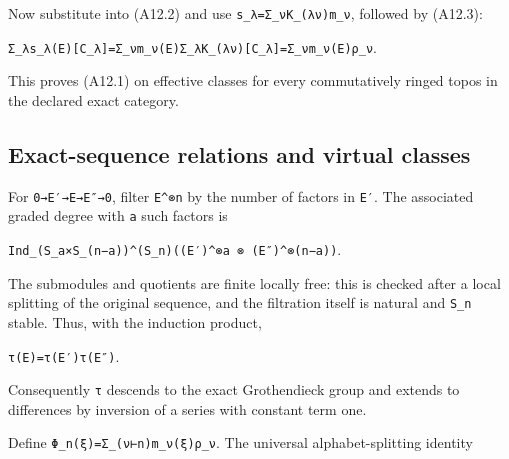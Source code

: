 \documentclass[
  10pt,
]{article}
\begin{document}
Now substitute into (A12.2) and use
\texttt{\small s\_\allowbreak{}λ=\allowbreak{}Σ\_\allowbreak{}νK\_\allowbreak{}(\allowbreak{}λν)\allowbreak{}m\_\allowbreak{}ν},
followed by (A12.3):

\texttt{\small Σ\_\allowbreak{}λs\_\allowbreak{}λ(\allowbreak{}E)\allowbreak{}[\allowbreak{}C\_\allowbreak{}λ]\allowbreak{}=\allowbreak{}Σ\_\allowbreak{}νm\_\allowbreak{}ν(\allowbreak{}E)\allowbreak{}Σ\_\allowbreak{}λK\_\allowbreak{}(\allowbreak{}λν)\allowbreak{}[\allowbreak{}C\_\allowbreak{}λ]\allowbreak{}=\allowbreak{}Σ\_\allowbreak{}νm\_\allowbreak{}ν(\allowbreak{}E)\allowbreak{}ρ\_\allowbreak{}ν}.

This proves (A12.1) on effective classes for every commutatively ringed
topos in the declared exact category.

\subsection{Exact-sequence relations and virtual
classes}\label{exact-sequence-relations-and-virtual-classes}

For
\texttt{\small 0→\allowbreak{}E′→\allowbreak{}E→\allowbreak{}E″→\allowbreak{}0},
filter \texttt{\small E\textasciicircum{}⊗\allowbreak{}n} by the number
of factors in \texttt{\small E′}. The associated graded degree with
\texttt{\small a} such factors is

\texttt{\small Ind\_\allowbreak{}(\allowbreak{}S\_\allowbreak{}a×S\_\allowbreak{}(\allowbreak{}n−a)\allowbreak{})\allowbreak{}\textasciicircum{}(\allowbreak{}S\_\allowbreak{}n)\allowbreak{}(\allowbreak{}(\allowbreak{}E′)\allowbreak{}\textasciicircum{}⊗\allowbreak{}a ⊗\allowbreak{} (\allowbreak{}E″)\allowbreak{}\textasciicircum{}⊗\allowbreak{}(\allowbreak{}n−a)\allowbreak{})\allowbreak{}}.

The submodules and quotients are finite locally free: this is checked
after a local splitting of the original sequence, and the filtration
itself is natural and \texttt{\small S\_\allowbreak{}n} stable. Thus,
with the induction product,

\texttt{\small τ(\allowbreak{}E)\allowbreak{}=\allowbreak{}τ(\allowbreak{}E′)\allowbreak{}τ(\allowbreak{}E″)\allowbreak{}}.

Consequently \texttt{\small τ} descends to the exact Grothendieck group
and extends to differences by inversion of a series with constant term
one.

Define
\texttt{\small Φ\_\allowbreak{}n(\allowbreak{}ξ)\allowbreak{}=\allowbreak{}Σ\_\allowbreak{}(\allowbreak{}ν⊢n)\allowbreak{}m\_\allowbreak{}ν(\allowbreak{}ξ)\allowbreak{}ρ\_\allowbreak{}ν}.
The universal alphabet-splitting identity
\end{document}
